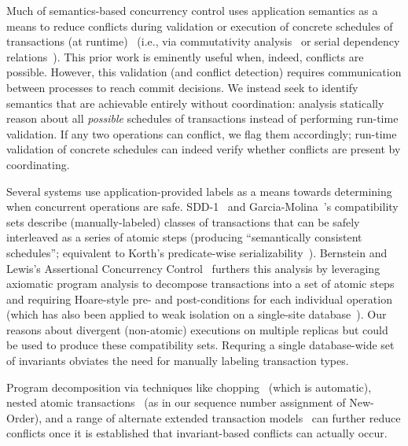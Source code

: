 Much of semantics-based concurrency control uses application semantics
as a means to reduce conflicts during validation or execution of
concrete schedules of transactions (at
runtime)~\cite{badrinath-semantics} (i.e., via commutativity
analysis~\cite{weihl-thesis} or serial dependency
relations~\cite{herlihy-apologizing}). This prior work is eminently
useful when, indeed, conflicts are possible. However, this validation
(and conflict detection) requires communication between processes to
reach commit decisions. We instead seek to identify semantics that are
achievable entirely without coordination: \iconfluence analysis
statically reason about all \textit{possible} schedules of
transactions instead of performing run-time validation. If any two
operations can conflict, we flag them accordingly; run-time validation
of concrete schedules can indeed verify whether conflicts are present
by coordinating.

Several systems use application-provided labels as a means towards
determining when concurrent operations are safe. SDD-1~\cite{sdd1} and
Garcia-Molina~\cite{garciamolina-semantics}'s compatibility sets
describe (manually-labeled) classes of transactions that can be safely
interleaved as a series of atomic steps (producing ``semantically
consistent schedules''; equivalent to Korth's predicate-wise
serializability~\cite{korth-serializability}). Bernstein and Lewis's
Assertional Concurrency Control~\cite{decomp-semantics} furthers this
analysis by leveraging axiomatic program analysis to decompose
transactions into a set of atomic steps and requiring Hoare-style pre-
and post-conditions for each individual operation (which has also been
applied to weak isolation on a single-site
database~\cite{isolation-semantics}). Our \iconfluence reasons about
divergent (non-atomic) executions on multiple replicas but could be
used to produce these compatibility sets. Requring a single
database-wide set of invariants obviates the need for manually
labeling transaction types.

Program decomposition via techniques like chopping~\cite{chopping}
(which is automatic), nested atomic
transactions~\cite{atomictransactions} (as in our sequence number
assignment of New-Order), and a range of alternate extended
  transaction models~\cite{acta} can further reduce conflicts once it
is established that invariant-based conflicts can actually occur.

